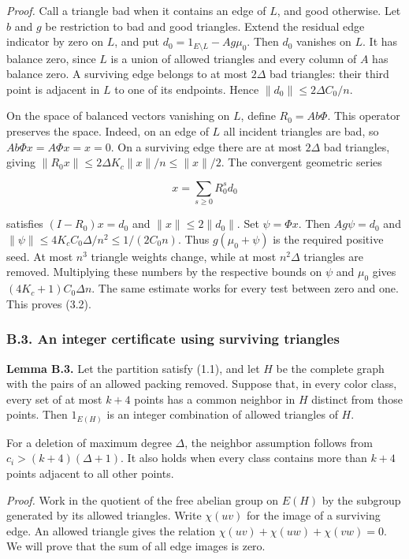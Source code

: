 \documentclass[english,11pt,a4paper]{article}
\begin{document}
\emph{Proof.} Call a triangle bad when it contains an edge of \(L\), and good otherwise. Let \(b\) and \(g\) be restriction to bad and good triangles. Extend the residual edge indicator by zero on \(L\), and put \(d_0=1_{E\setminus L}-Ag\mu_0\). Then \(d_0\) vanishes on \(L\). It has balance zero, since \(L\) is a union of allowed triangles and every column of \(A\) has balance zero. A surviving edge belongs to at most \(2\Delta\) bad triangles: their third point is adjacent in \(L\) to one of its endpoints. Hence \(\|d_0\|\le2\Delta C_0/n\).

On the space of balanced vectors vanishing on \(L\), define \(R_0=Ab\Phi\). This operator preserves the space. Indeed, on an edge of \(L\) all incident triangles are bad, so \(Ab\Phi x=A\Phi x=x=0\). On a surviving edge there are at most \(2\Delta\) bad triangles, giving \(\|R_0x\|\le2\Delta K_c\|x\|/n\le\|x\|/2\). The convergent geometric series

\[x=\sum_{s\ge0}R_0^s d_0\]

satisfies \((I-R_0)x=d_0\) and \(\|x\|\le2\|d_0\|\). Set \(\psi=\Phi x\). Then \(Ag\psi=d_0\) and \(\|\psi\|\le4K_cC_0\Delta/n^2\le1/(2C_0n)\). Thus \(g(\mu_0+\psi)\) is the required positive seed. At most \(n^3\) triangle weights change, while at most \(n^2\Delta\) triangles are removed. Multiplying these numbers by the respective bounds on \(\psi\) and \(\mu_0\) gives \((4K_c+1)C_0\Delta n\). The same estimate works for every test between zero and one. This proves (3.2).

\subsubsection{B.3. An integer certificate using surviving triangles}\label{b.3.-an-integer-certificate-using-surviving-triangles}

\textbf{Lemma B.3.} Let the partition satisfy (1.1), and let \(H\) be the complete graph with the pairs of an allowed packing removed. Suppose that, in every color class, every set of at most \(k+4\) points has a common neighbor in \(H\) distinct from those points. Then \(1_{E(H)}\) is an integer combination of allowed triangles of \(H\).

For a deletion of maximum degree \(\Delta\), the neighbor assumption follows from \(c_i>(k+4)(\Delta+1)\). It also holds when every class contains more than \(k+4\) points adjacent to all other points.

\emph{Proof.} Work in the quotient of the free abelian group on \(E(H)\) by the subgroup generated by its allowed triangles. Write \(\chi(uv)\) for the image of a surviving edge. An allowed triangle gives the relation \(\chi(uv)+\chi(uw)+\chi(vw)=0\). We will prove that the sum of all edge images is zero.
\end{document}

